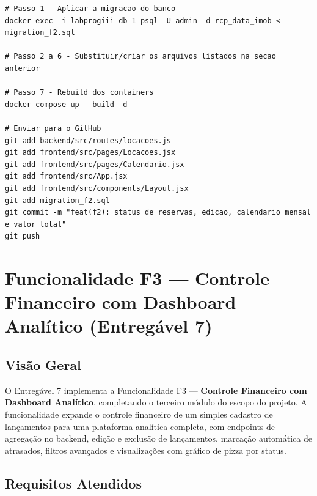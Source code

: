 \documentclass[12pt, a4paper]{article}
\begin{document}
\begin{lstlisting}
# Passo 1 - Aplicar a migracao do banco
docker exec -i labprogiii-db-1 psql -U admin -d rcp_data_imob < migration_f2.sql

# Passo 2 a 6 - Substituir/criar os arquivos listados na secao anterior

# Passo 7 - Rebuild dos containers
docker compose up --build -d

# Enviar para o GitHub
git add backend/src/routes/locacoes.js
git add frontend/src/pages/Locacoes.jsx
git add frontend/src/pages/Calendario.jsx
git add frontend/src/App.jsx
git add frontend/src/components/Layout.jsx
git add migration_f2.sql
git commit -m "feat(f2): status de reservas, edicao, calendario mensal e valor total"
git push
\end{lstlisting}

\section{Funcionalidade F3 — Controle Financeiro com Dashboard Analítico (Entregável 7)}

\subsection{Visão Geral}

O Entregável 7 implementa a Funcionalidade F3 — \textbf{Controle Financeiro com Dashboard Analítico}, completando o terceiro módulo do escopo do projeto. A funcionalidade expande o controle financeiro de um simples cadastro de lançamentos para uma plataforma analítica completa, com endpoints de agregação no backend, edição e exclusão de lançamentos, marcação automática de atrasados, filtros avançados e visualizações com gráfico de pizza por status.

\subsection{Requisitos Atendidos}
\end{document}
